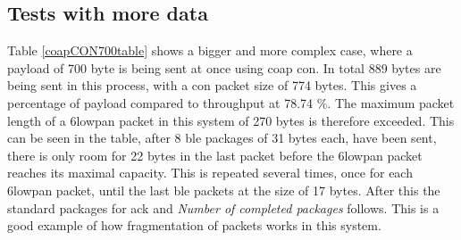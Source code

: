 \subsection{Tests with more data}

\noindent Table \ref{coapCON700table} shows a bigger and more complex case, where a payload of 700 byte is being sent at once using \gls{coap} \gls{con}. In total 889 bytes are being sent in this process, with a \gls{con} packet size of 774 bytes. This gives a percentage of \gls{payload} compared to \gls{throughput} at 78.74 \%. The maximum packet length of a \gls{6lowpan} packet in this system of 270 bytes  is therefore exceeded. This can be seen in the table, after 8 \gls{ble} packages of 31 bytes each, have been sent, there is only room for 22 bytes in the last packet before the \gls{6lowpan} packet reaches its maximal capacity. This is repeated several times, once for each \gls{6lowpan} packet, until the last \gls{ble} packets at the size of 17 bytes. After this the standard packages for \gls{ack} and \textit{Number of completed packages} follows. This is a good example of how fragmentation of packets works in this system. 



